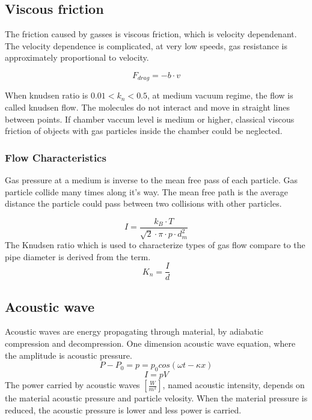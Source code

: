 \documentclass[\main/master.tex]{subfiles}
\begin{document}
\subsection{Viscous friction}
The friction caused by gasses is viscous friction, which is velocity dependenant. The velocity dependence is complicated, at very low speeds, gas resistance is approximately proportional to velocity. 

\begin{equation}
F_{drag} = -b\cdot v  \label{eqn:energy-mass-equivalence-relation}
\end{equation}

When knudsen ratio is $0.01<k_n<0.5$, at medium vacuum regime, the flow is called knudsen flow. The molecules do not interact and move in straight lines between points. If chamber vaccum level is medium or higher, classical viscous friction of objects with gas particles inside the chamber could be neglected.
\subsubsection{Flow Characteristics}
Gas pressure at a medium is inverse to the mean free pass of each particle. Gas particle collide many times along it's way. The mean free path is the average distance the particle could pass between two collisions with other particles. 


\begin{equation}
I = \frac{k_B\cdot T}{\sqrt{2}\cdot\pi\cdot p\cdot d_m^2}     \label{eqn:mean-free-pass}
\end{equation}
 The Knudsen ratio which is used to characterize types of gas flow compare to the pipe diameter is derived from the term.
\begin{equation}
K_n = \frac{I}{d}     \label{eqn:mean-free-pass}
\end{equation}

\subsection{Acoustic wave}
Acoustic waves are energy propagating through material, by adiabatic compression and decompression. One dimension acoustic wave equation, where the amplitude is acoustic pressure.
\begin{equation}
P-P_0 = p = p_0cos(\omega t -\kappa x)       \label{eqn:acoustic_pressure}
\end{equation}
\begin{equation}
I = pV      \label{eqn:acoustic_intensity}
\end{equation} 
The power carried by acoustic waves $[\frac{W}{m^2}]$, named acoustic intensity, depends on the material acoustic pressure and particle velosity. When the material pressure is reduced, the acoustic pressure is lower and less power is carried.
\end{document}

